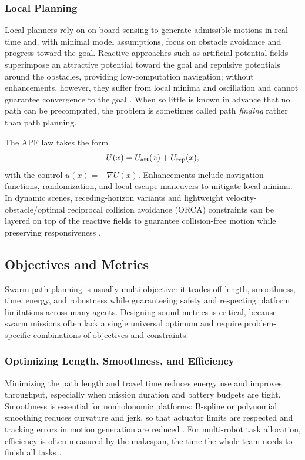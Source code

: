 \subsubsection{Local Planning}

Local planners rely on on-board sensing to generate admissible motions in real
time and, with minimal model assumptions, focus on obstacle avoidance and
progress toward the goal. Reactive approaches such as artificial potential fields
superimpose an attractive potential toward the goal and repulsive potentials
around the obstacles, providing low-computation navigation; without enhancements,
however, they suffer from local minima and oscillation and cannot guarantee
convergence to the goal \cite{zhang2023multi,bhowmick2024bio}. When so little is
known in advance that no path can be precomputed, the problem is sometimes
called path \emph{finding} rather than path planning.

The APF law takes the form
\begin{equation}
  U(x) = U_{\mathrm{att}}(x) + U_{\mathrm{rep}}(x),
  \label{eq:apf-basic}
\end{equation}
with the control $u(x) = -\nabla U(x)$. Enhancements include navigation
functions, randomization, and local escape maneuvers to mitigate local minima.
In dynamic scenes, receding-horizon variants and lightweight
velocity-obstacle/optimal reciprocal collision avoidance (ORCA) constraints can
be layered on top of the reactive fields to guarantee collision-free motion while
preserving responsiveness \cite{nguyen2024swarm}.

\subsection{Objectives and Metrics}

Swarm path planning is usually multi-objective: it trades off length, smoothness,
time, energy, and robustness while guaranteeing safety and respecting platform
limitations across many agents. Designing sound metrics is critical, because
swarm missions often lack a single universal optimum and require problem-specific
combinations of objectives and constraints.

\subsubsection{Optimizing Length, Smoothness, and Efficiency}

Minimizing the path length and travel time reduces energy use and improves
throughput, especially when mission duration and battery budgets are tight.
Smoothness is essential for nonholonomic platforms: B-spline or polynomial
smoothing reduces curvature and jerk, so that actuator limits are respected and
tracking errors in motion generation are reduced \cite{panigrahi2011handbook}.
For multi-robot task allocation, efficiency is often measured by the makespan,
the time the whole team needs to finish all tasks \cite{lin2022review}.

